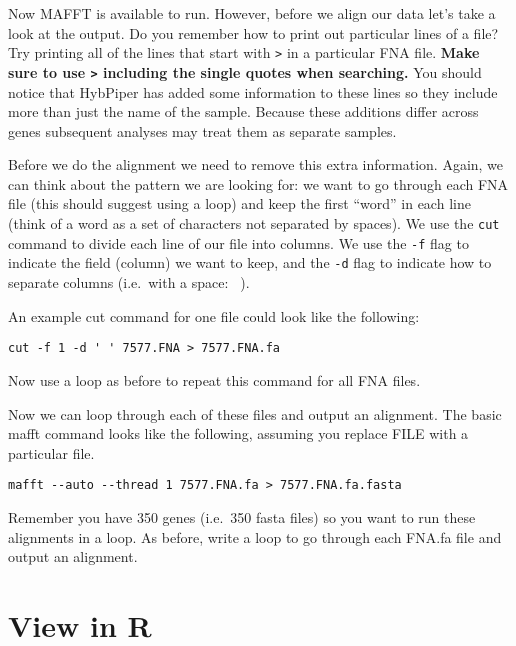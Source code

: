 \documentclass[
]{book}
\begin{document}
Now MAFFT is available to run.
However, before we align our data let's take a look at the output.
Do you remember how to print out particular lines of a file?
Try printing all of the lines that start with \texttt{\textquotesingle{}\textgreater{}\textquotesingle{}} in a particular FNA file. \textbf{Make sure to use \texttt{\textquotesingle{}\textgreater{}\textquotesingle{}} including the single quotes when searching.}
You should notice that HybPiper has added some information to these lines so they include more than just the name of the sample. Because these additions differ across genes subsequent analyses may treat them as separate samples.

Before we do the alignment we need to remove this extra information.
Again, we can think about the pattern we are looking for: we want to go through each FNA file (this should suggest using a loop) and keep the first ``word'' in each line (think of a word as a set of characters not separated by spaces).
We use the \texttt{cut} command to divide each line of our file into columns.
We use the \texttt{-f} flag to indicate the field (column) we want to keep, and the \texttt{-d} flag to indicate how to separate columns (i.e.~with a space: \texttt{\textquotesingle{}\ \textquotesingle{}}).

An example cut command for one file could look like the following:

\begin{verbatim}
cut -f 1 -d ' ' 7577.FNA > 7577.FNA.fa
\end{verbatim}

Now use a loop as before to repeat this command for all FNA files.

Now we can loop through each of these files and output an alignment.
The basic mafft command looks like the following, assuming you replace FILE with a particular file.

\begin{verbatim}
mafft --auto --thread 1 7577.FNA.fa > 7577.FNA.fa.fasta
\end{verbatim}

Remember you have 350 genes (i.e.~350 fasta files) so you want to run these alignments in a loop.
As before, write a loop to go through each FNA.fa file and output an alignment.

\hypertarget{view-in-r}{%
\section{View in R}\label{view-in-r}}
\end{document}
